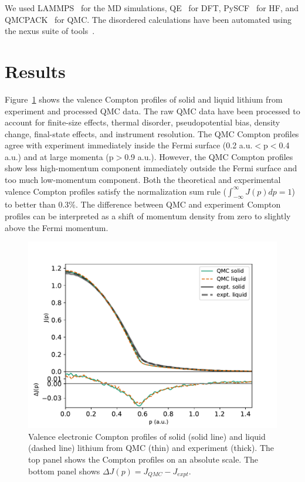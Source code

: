 \documentclass[aps,prb,showpacs,preprintnumbers,amsmath,amssymb,superscriptaddress,twocolumn]{revtex4-1}
\begin{document}
We used LAMMPS~\cite{Plimpton1995} for the MD simulations, QE~\cite{Giannozzi2009,Giannozzi2017} for DFT, PySCF~\cite{PYSCF} for HF, and QMCPACK~\cite{Kim2018} for QMC. The disordered calculations have been automated using the nexus suite of tools~\cite{Krogel2016}.

\section{Results} \label{sec:results}

Figure~\ref{fig:sl-jp-djp} shows the valence Compton profiles of solid and liquid lithium from experiment and processed QMC data. The raw QMC data have been processed to account for finite-size effects, thermal disorder, pseudopotential bias, density change, final-state effects, and instrument resolution. The QMC Compton profiles agree with experiment immediately inside the Fermi surface (0.2 a.u.$<$p$<$0.4 a.u.) and at large momenta (p$>$0.9  a.u.). However, the QMC Compton profiles show less high-momentum component immediately outside the Fermi surface and too much low-momentum component. Both the theoretical and experimental valence Compton profiles satisfy the normalization sum rule ($\int_{-\infty}^{\infty} J(p)dp=1$) to better than 0.3\%. The difference between QMC and experiment Compton profiles can be interpreted as a shift of momentum density from zero to slightly above the Fermi momentum. 

\begin{figure}[h]
\includegraphics[width=\linewidth]{li58_sl-jp}
\caption{Valence electronic Compton profiles of solid (solid line) and liquid (dashed line) lithium from QMC (thin) and experiment (thick). The top panel shows the Compton profiles on an absolute scale. The bottom panel shows  $\Delta J(p)=J_{QMC}-J_{expt}$.}%
\label{fig:sl-jp-djp}
\end{figure}
\end{document}
